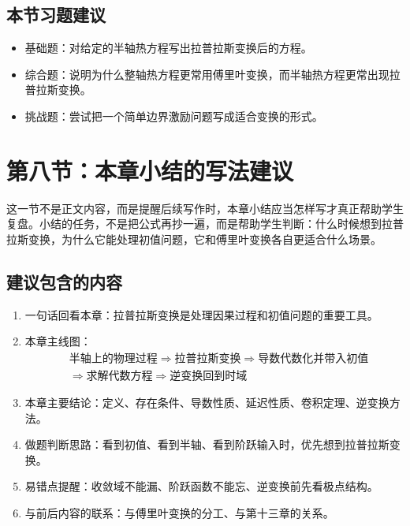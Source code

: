 \subsection*{本节习题建议}
\begin{itemize}
    \item 基础题：对给定的半轴热方程写出拉普拉斯变换后的方程。
    \item 综合题：说明为什么整轴热方程更常用傅里叶变换，而半轴热方程更常出现拉普拉斯变换。
    \item 挑战题：尝试把一个简单边界激励问题写成适合变换的形式。
\end{itemize}

\section{第八节：本章小结的写法建议}

\begin{wulibj}[本节角色]
这一节不是正文内容，而是提醒后续写作时，本章小结应当怎样写才真正帮助学生复盘。小结的任务，不是把公式再抄一遍，而是帮助学生判断：什么时候想到拉普拉斯变换，为什么它能处理初值问题，它和傅里叶变换各自更适合什么场景。
\end{wulibj}

\subsection*{建议包含的内容}
\begin{enumerate}
    \item 一句话回看本章：拉普拉斯变换是处理因果过程和初值问题的重要工具。
    \item 本章主线图：
    \[
        \begin{aligned}
            &\text{半轴上的物理过程}
            \Longrightarrow
            \text{拉普拉斯变换}
            \Longrightarrow
            \text{导数代数化并带入初值} \\
            &\Longrightarrow
            \text{求解代数方程}
            \Longrightarrow
            \text{逆变换回到时域}
        \end{aligned}
    \]
    \item 本章主要结论：定义、存在条件、导数性质、延迟性质、卷积定理、逆变换方法。
    \item 做题判断思路：看到初值、看到半轴、看到阶跃输入时，优先想到拉普拉斯变换。
    \item 易错点提醒：收敛域不能漏、阶跃函数不能忘、逆变换前先看极点结构。
    \item 与前后内容的联系：与傅里叶变换的分工、与第十三章的关系。
\end{enumerate}

